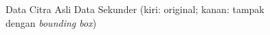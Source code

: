 \begin{figure}[H]
	\vspace{-0.1cm}
	\centering
	\qquad
	\vspace{-0.2cm}
	\captionsetup{justification=centering}
	\caption{Data Citra Asli Data Sekunder (kiri: original; kanan: tampak dengan \textit{bounding box}) }\label{img:Data-Citra-Asli-Data-Sekunder}
\end{figure}

